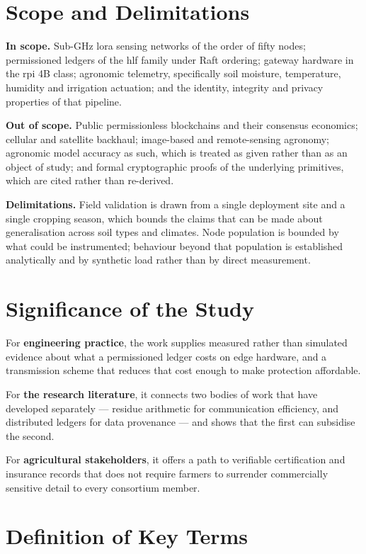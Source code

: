\documentclass[12pt,a4paper,oneside]{book}
\begin{document}
\section{Scope and Delimitations}
\label{sec:scope}

\textbf{In scope.} Sub-GHz \gls{lora} sensing networks of the order of fifty
nodes; permissioned ledgers of the \gls{hlf} family under Raft ordering;
gateway hardware in the \gls{rpi} 4B class; agronomic telemetry, specifically
soil moisture, temperature, humidity and irrigation actuation; and the
identity, integrity and privacy properties of that pipeline.

\textbf{Out of scope.} Public permissionless blockchains and their consensus
economics; cellular and satellite backhaul; image-based and remote-sensing
agronomy; agronomic model accuracy as such, which is treated as given rather
than as an object of study; and formal cryptographic proofs of the underlying
primitives, which are cited rather than re-derived.

\textbf{Delimitations.} Field validation is drawn from a single deployment site
and a single cropping season, which bounds the claims that can be made about
generalisation across soil types and climates. Node population is bounded by
what could be instrumented; behaviour beyond that population is established
analytically and by synthetic load rather than by direct measurement.

\section{Significance of the Study}
\label{sec:significance}

For \textbf{engineering practice}, the work supplies measured rather than
simulated evidence about what a permissioned ledger costs on edge hardware, and
a transmission scheme that reduces that cost enough to make protection
affordable.

For \textbf{the research literature}, it connects two bodies of work that have
developed separately — residue arithmetic for communication efficiency, and
distributed ledgers for data provenance — and shows that the first can subsidise
the second.

For \textbf{agricultural stakeholders}, it offers a path to verifiable
certification and insurance records that does not require farmers to surrender
commercially sensitive detail to every consortium member.

\section{Definition of Key Terms}
\label{sec:definitions}
\end{document}
